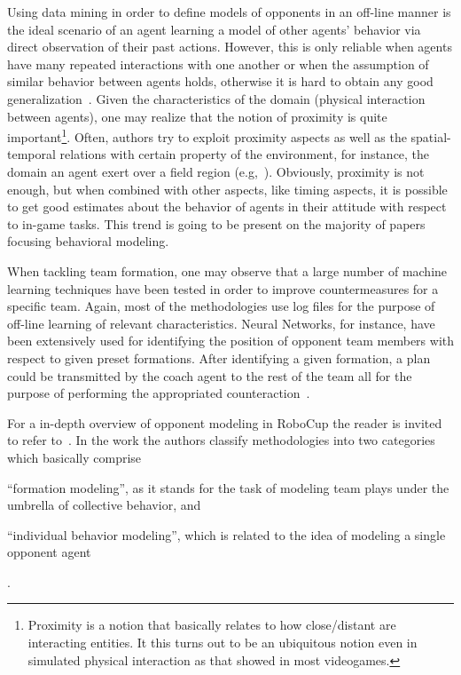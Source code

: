Using data mining in order to define models of opponents in an off-line manner is the ideal scenario of an agent learning a model of other agents' behavior via direct observation of their past actions. However, this is only reliable when agents have many repeated interactions with one another or when the assumption of similar behavior between agents holds, otherwise it is hard to obtain any good generalization~\citep{stone_defining_2000}. Given the characteristics of the domain (physical interaction between agents), one may realize that the notion of proximity is quite important\footnote{Proximity is a notion that basically relates to how close/distant are interacting entities. It this turns out to be an ubiquitous notion even in simulated physical interaction as that showed in most videogames.}. Often, authors try to exploit proximity aspects as well as the spatial-temporal relations with certain property of the environment, for instance, the domain an agent exert over a field region (e.g,~\cite{riley_empirical_2002}). Obviously, proximity is not enough, but when combined with other aspects, like timing aspects, it is possible to get good estimates about the behavior of agents in their attitude with respect to in-game tasks. This trend is going to be present on the majority of papers focusing behavioral modeling.

When tackling team formation, one may observe that a large number of machine learning techniques have been tested in order to improve countermeasures for a specific team. Again, most of the methodologies use log files for the purpose of off-line learning of relevant characteristics. Neural Networks, for instance, have been extensively used for identifying the position of opponent team members with respect to given preset formations. After identifying a given formation, a plan could be transmitted by the coach agent to the rest of the team all for the purpose of performing the appropriated counteraction~\citep{nakashima_off-line_2010,ramos_discovering_2008, faria_machine_2010, visser_recognizing_2001}.


For a in-depth overview of opponent modeling in RoboCup the reader is invited to refer to~\cite{rofer_overview_2012}. In the work the authors classify methodologies into two categories which basically comprise \begin{inparaenum}\item``formation modeling'', as it stands for the task of modeling team plays under the umbrella of collective behavior, and \item``individual behavior modeling'', which is related to the idea of modeling a single opponent agent\end{inparaenum}.

